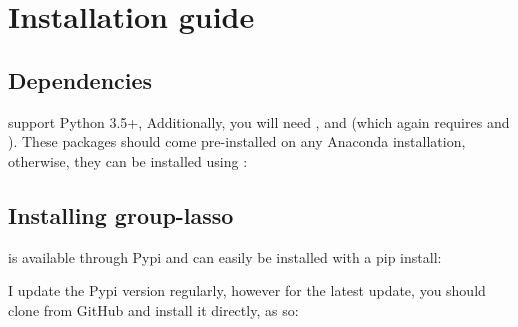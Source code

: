 \documentclass[letterpaper,10pt,english]{sphinxmanual}
\begin{document}
\section{Installation guide}
\label{\detokenize{installation:installation-guide}}\label{\detokenize{installation::doc}}

\subsection{Dependencies}
\label{\detokenize{installation:dependencies}}
 support Python 3.5+, Additionally, you will need ,
and  (which again requires  and ). These
packages should come pre-installed on any Anaconda installation, otherwise,
they can be installed using :

\begin{sphinxVerbatim}[commandchars=\\\{\}]
  
  
\end{sphinxVerbatim}


\subsection{Installing group-lasso}
\label{\detokenize{installation:installing-group-lasso}}
 is available through Pypi and can easily be installed with a
pip install:

\begin{sphinxVerbatim}[commandchars=\\\{\}]
  
\end{sphinxVerbatim}

I update the Pypi version regularly, however for the latest update, you should
clone from GitHub and install it directly, as so:

\begin{sphinxVerbatim}[commandchars=\\\{\}]
  
 
 
\end{sphinxVerbatim}
\end{document}
